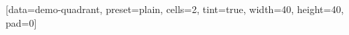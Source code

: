 \documentclass{article}
\begin{document}
\ExplSyntaxOn
\SemioVizProbeOn
\SemioVizChartsDryRun
{}
[data=demo-quadrant, preset=plain, cells=2, tint=true, width=40, height=40, pad=0]
\ExplSyntaxOff
\end{document}
